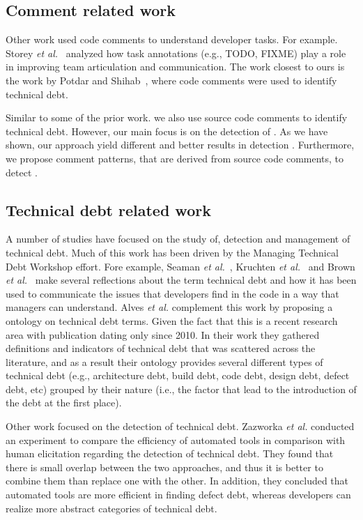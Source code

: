 
\subsection{Comment related work}

Other work used code comments to understand developer tasks. For example. Storey \textit{et al.}~\cite{Storey2008ICSE} analyzed how task annotations (e.g., TODO, FIXME) play a role in improving team articulation and communication. The work closest to ours is the work by Potdar and Shihab~\cite{Potdar2014ICSME}, where code comments were used to identify technical debt. 

Similar to some of the prior work. we also use source code comments to identify technical debt. However, our main focus is on the detection of . As we have shown, our approach yield different and better results in detection . Furthermore, we propose comment patterns, that are derived from source code comments, to detect .

\subsection{Technical debt related work}

A number of studies have focused on the study of, detection and management of technical debt. Much of this work has been driven by the Managing Technical Debt Workshop effort. Fore example, Seaman \textit{et al.}~\cite{Seaman2011}, Kruchten \textit{et al.}~\cite{Kruchten2013IWMTD} and Brown \textit{et al.}~\cite{Brown2010MTD} make several reflections about the term technical debt and how it has been used to communicate the issues that developers find in the code in a way that managers can understand. Alves \textit{et al.} \cite{Alves2014MTD} complement this work by proposing a ontology on technical debt terms. Given the fact that this is a recent research area with publication dating only since 2010. In their work they gathered definitions and indicators of technical debt that was scattered across the literature, and as a result their ontology provides several different types of technical debt (e.g., architecture debt, build debt, code debt, design debt, defect debt, etc) grouped by their nature (i.e., the factor that lead to the introduction of the debt at the first place).  

Other work focused on the detection of technical debt. Zazworka \textit{et al.} \cite{Zazworka2013CSE} conducted an experiment to compare the efficiency of automated tools in comparison with human elicitation regarding the detection of technical debt. They found that there is small overlap between the two approaches, and thus it is better to combine them than replace one with the other. In addition, they concluded that automated tools are more efficient in finding defect debt, whereas developers can realize more abstract categories of technical debt.

